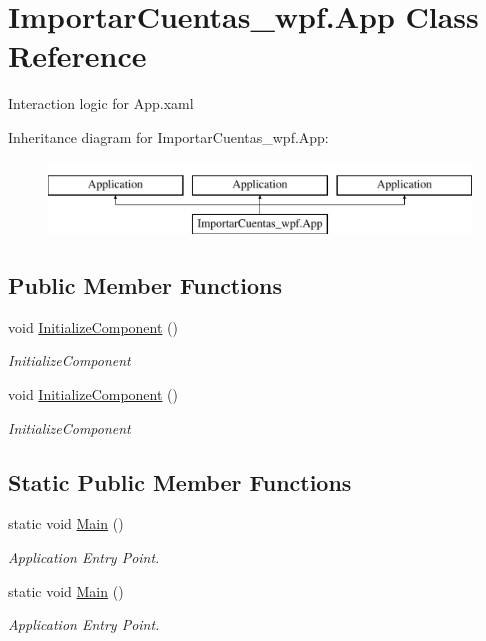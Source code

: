 \hypertarget{class_importar_cuentas__wpf_1_1_app}{\section{Importar\-Cuentas\-\_\-wpf.\-App Class Reference}
\label{class_importar_cuentas__wpf_1_1_app}
}


Interaction logic for App.\-xaml  


Inheritance diagram for Importar\-Cuentas\-\_\-wpf.\-App\-:\begin{figure}[H]
\begin{center}
\leavevmode
\includegraphics[height=2.000000cm]{d5/db0/class_importar_cuentas__wpf_1_1_app}
\end{center}
\end{figure}
\subsection*{Public Member Functions}
\begin{DoxyCompactItemize}
\item 
void \hyperlink{class_importar_cuentas__wpf_1_1_app_aa642a2e8d05481d9253fab1fce13287c}{Initialize\-Component} ()
\begin{DoxyCompactList}\small\item\em Initialize\-Component \end{DoxyCompactList}\item 
void \hyperlink{class_importar_cuentas__wpf_1_1_app_aa642a2e8d05481d9253fab1fce13287c}{Initialize\-Component} ()
\begin{DoxyCompactList}\small\item\em Initialize\-Component \end{DoxyCompactList}\end{DoxyCompactItemize}
\subsection*{Static Public Member Functions}
\begin{DoxyCompactItemize}
\item 
static void \hyperlink{class_importar_cuentas__wpf_1_1_app_aebdfe0f105305f342d26114c3d589db0}{Main} ()
\begin{DoxyCompactList}\small\item\em Application Entry Point. \end{DoxyCompactList}\item 
static void \hyperlink{class_importar_cuentas__wpf_1_1_app_aebdfe0f105305f342d26114c3d589db0}{Main} ()
\begin{DoxyCompactList}\small\item\em Application Entry Point. \end{DoxyCompactList}\end{DoxyCompactItemize}


